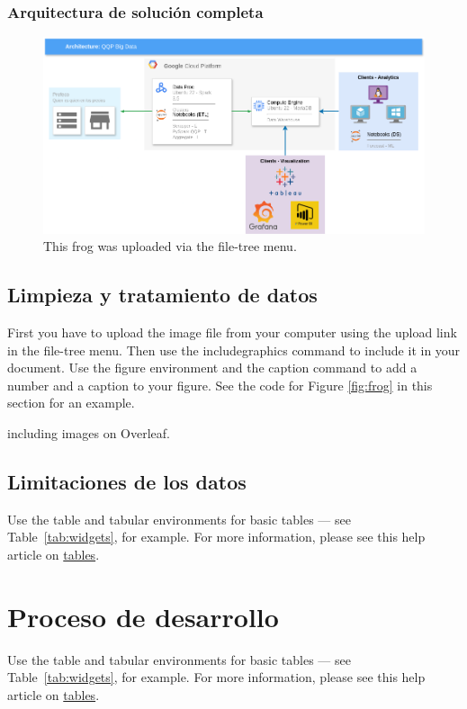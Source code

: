 \documentclass{article}
\begin{document}
\subsubsection{Arquitectura de solución completa}
\begin{figure}[h]
\centering
\includegraphics[width=0.9\linewidth]{images/Architecture_QQP_BD.png}
\caption{\label{fig:Architecture}This frog was uploaded via the file-tree menu.}
\end{figure}

\subsection{Limpieza y tratamiento de datos}

First you have to upload the image file from your computer using the upload link in the file-tree menu. Then use the includegraphics command to include it in your document. Use the figure environment and the caption command to add a number and a caption to your figure. See the code for Figure \ref{fig:frog} in this section for an example.

{including images on Overleaf}.

\subsection{Limitaciones de los datos}

Use the table and tabular environments for basic tables --- see Table~\ref{tab:widgets}, for example. For more information, please see this help article on \href{https://www.overleaf.com/learn/latex/tables}{tables}. 

\section{Proceso de desarrollo}

Use the table and tabular environments for basic tables --- see Table~\ref{tab:widgets}, for example. For more information, please see this help article on \href{https://www.overleaf.com/learn/latex/tables}{tables}. 
\end{document}
